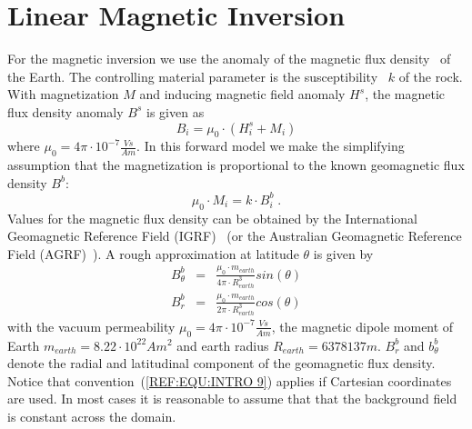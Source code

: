 
%
%
%


\section{Linear Magnetic Inversion}\label{sec:forward magnetic}
For the magnetic inversion we use the anomaly of the magnetic flux
density~ of the Earth.
The controlling material parameter is the susceptibility~
$k$ of the rock.
With magnetization $M$ and inducing magnetic field anomaly $H^s$, the magnetic
flux density anomaly $B^s$ is given as
\begin{equation}\label{ref:MAG:EQU:1}
B_i = \mu_0 \cdot ( H^s_i  + M_i )
\end{equation}
where $\mu_0 = 4 \pi \cdot 10^{-7} \frac{Vs}{Am}$.
In this forward model we make the simplifying assumption that the magnetization
is proportional to the known geomagnetic flux density $B^b$:
\begin{equation}\label{ref:MAG:EQU:4}
\mu_0  \cdot M_i = k \cdot B^b_i \;. 
\end{equation}
Values for the magnetic flux density can be obtained by the International
Geomagnetic Reference Field (IGRF)~\cite{IGRF}
(or the Australian Geomagnetic Reference Field (AGRF)~\cite{AGRF}).
A rough approximation at latitude $\theta$ is given by 
\begin{equation}\label{ref:MAG:EQU:5}
\begin{array}{rcl}
B^b_{\theta}  & = & \displaystyle{ \frac{ \mu_0 \cdot m_{earth}}{4 \pi \cdot R_{earth}^3} sin(\theta) }  \\
B^b_r & = & \displaystyle{ \frac{\mu_0 \cdot  m_{earth}}{2 \pi \cdot R_{earth}^3} cos(\theta) }
\end{array}
\end{equation}
with the vacuum permeability $\mu_0 = 4 \pi \cdot 10^{-7} \frac{Vs}{Am}$,
the magnetic dipole moment of Earth $m_{earth}=8.22 \cdot 10^{22} Am^2$ and
earth radius $R_{earth}= 6378137m$.
$B^b_r$ and $b^b_{\theta}$ denote the radial and latitudinal component of the
geomagnetic flux density.
Notice that convention~(\ref{REF:EQU:INTRO 9}) applies if Cartesian
coordinates are used.
In most cases it is reasonable to assume that that the background field is
constant across the domain.

